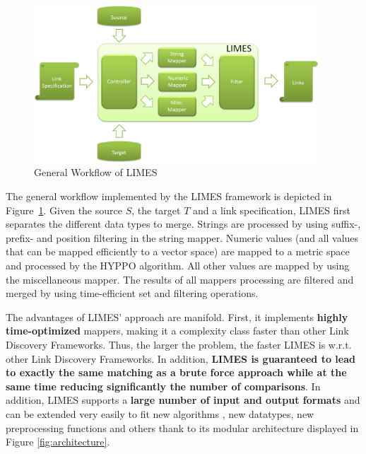 \documentclass[a4paper, 11pt]{article}
\begin{document}
		\begin{figure}[ht!]
			\centering
			\includegraphics[width = 0.95\textwidth]{images/workflow.png}
			\caption{General Workflow of LIMES}
			\label{fig:workflow}
		\end{figure}

The general workflow implemented by the LIMES framework is depicted in Figure~\ref{fig:workflow}.
Given the source $S$, the target $T$ and a link specification, LIMES first separates the different data types to merge. 
Strings are processed by using suffix-, prefix- and position filtering in the string mapper.
Numeric values (and all values that can be mapped efficiently to a vector space) are mapped to a metric space and processed by the HYPPO algorithm.
All other values are mapped by using the miscellaneous mapper.
The results of all mappers processing are filtered and merged by using time-efficient set and filtering operations.

The advantages of LIMES' approach are manifold. 
First, it implements \textbf{highly time-optimized} mappers, making it a complexity class faster than other Link Discovery Frameworks. Thus, the larger the problem, the faster LIMES is w.r.t. other Link Discovery Frameworks. In addition, \textbf{LIMES is guaranteed to lead to exactly the same matching as a brute force approach while at the same time reducing significantly the number of comparisons}. In addition, LIMES supports a \textbf{large number of input and output formats} and can be extended very easily to fit new algorithms , new datatypes, new preprocessing functions and others thank to its modular architecture displayed in Figure \ref{fig:architecture}.
\end{document}
